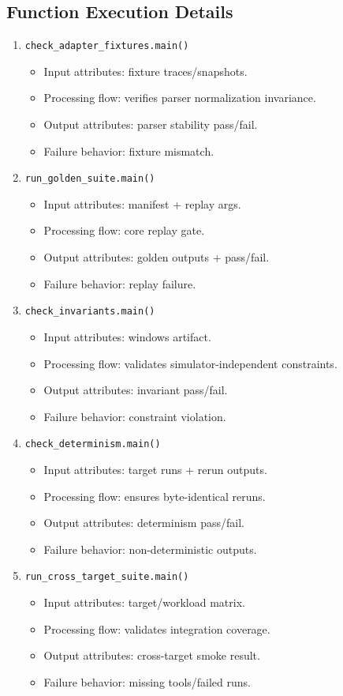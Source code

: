 \documentclass[11pt,a4paper]{article}
\begin{document}
\subsection*{Function Execution Details}
\begin{enumerate}[leftmargin=*]
  \item \texttt{check\_adapter\_fixtures.main()}
  \begin{itemize}[leftmargin=*]
    \item Input attributes: fixture traces/snapshots.
    \item Processing flow: verifies parser normalization invariance.
    \item Output attributes: parser stability pass/fail.
    \item Failure behavior: fixture mismatch.
  \end{itemize}
  \item \texttt{run\_golden\_suite.main()}
  \begin{itemize}[leftmargin=*]
    \item Input attributes: manifest + replay args.
    \item Processing flow: core replay gate.
    \item Output attributes: golden outputs + pass/fail.
    \item Failure behavior: replay failure.
  \end{itemize}
  \item \texttt{check\_invariants.main()}
  \begin{itemize}[leftmargin=*]
    \item Input attributes: windows artifact.
    \item Processing flow: validates simulator-independent constraints.
    \item Output attributes: invariant pass/fail.
    \item Failure behavior: constraint violation.
  \end{itemize}
  \item \texttt{check\_determinism.main()}
  \begin{itemize}[leftmargin=*]
    \item Input attributes: target runs + rerun outputs.
    \item Processing flow: ensures byte-identical reruns.
    \item Output attributes: determinism pass/fail.
    \item Failure behavior: non-deterministic outputs.
  \end{itemize}
  \item \texttt{run\_cross\_target\_suite.main()}
  \begin{itemize}[leftmargin=*]
    \item Input attributes: target/workload matrix.
    \item Processing flow: validates integration coverage.
    \item Output attributes: cross-target smoke result.
    \item Failure behavior: missing tools/failed runs.
  \end{itemize}
\end{enumerate}
\end{document}
